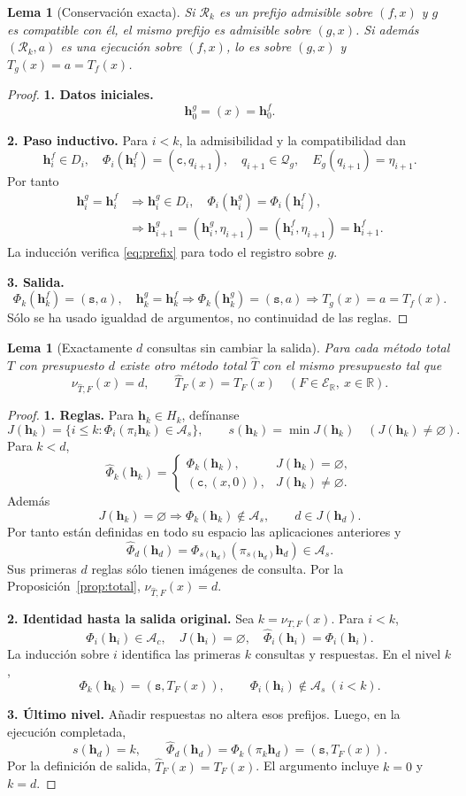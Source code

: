 \documentclass[11pt,a4paper]{article}
\numberwithin{equation}{section}
\newtheorem{lemma}[theorem]{Lema}
\theoremstyle{definition}
\theoremstyle{remark}
\newcommand{\R}{\mathbb R}
\newcommand{\ER}{\mathcal E_{\R}}
\newcommand{\QQ}{\mathcal Q}
\newcommand{\Rec}{\mathcal R}
\newcommand{\hc}{\mathbf h}
\newcommand{\ct}{\mathtt c}
\newcommand{\st}{\mathtt s}
\newcommand{\paso}[1]{\par\smallskip\noindent\textbf{#1}\quad}
\begin{document}
\begin{lemma}[Conservación exacta]\label{lem:preserve}
Si $\Rec_k$ es un prefijo admisible sobre $(f,x)$ y $g$ es compatible con él, el mismo prefijo es admisible sobre $(g,x)$. Si además $(\Rec_k,a)$ es una ejecución sobre $(f,x)$, lo es sobre $(g,x)$ y $T_g(x)=a=T_f(x)$.
\end{lemma}
\begin{proof}
\paso{1. Datos iniciales.}
\[
\hc_0^g=(x)=\hc_0^f.
\]
\paso{2. Paso inductivo.}
Para $i<k$, la admisibilidad y la compatibilidad dan
\[
\hc_i^f\in D_i,\quad\Phi_i(\hc_i^f)=(\ct,q_{i+1}),\quad
q_{i+1}\in\QQ_g,\quad E_g(q_{i+1})=\eta_{i+1}.
\]
Por tanto
\begin{align*}
\hc_i^g=\hc_i^f
&\Longrightarrow \hc_i^g\in D_i,\quad\Phi_i(\hc_i^g)=\Phi_i(\hc_i^f),\\
&\Longrightarrow\hc_{i+1}^g=(\hc_i^g,\eta_{i+1})
=(\hc_i^f,\eta_{i+1})=\hc_{i+1}^f.
\end{align*}
La inducción verifica \eqref{eq:prefix} para todo el registro sobre $g$.
\paso{3. Salida.}
\[
\Phi_k(\hc_k^f)=(\st,a),\quad\hc_k^g=\hc_k^f
\Longrightarrow\Phi_k(\hc_k^g)=(\st,a)
\Longrightarrow T_g(x)=a=T_f(x).
\]
Sólo se ha usado igualdad de argumentos, no continuidad de las reglas.
\end{proof}

\begin{lemma}[Exactamente $d$ consultas sin cambiar la salida]\label{lem:padding}
Para cada método total $T$ con presupuesto $d$ existe otro método total $\widehat T$ con el mismo presupuesto tal que
\[
\nu_{\widehat T,F}(x)=d,\qquad \widehat T_F(x)=T_F(x)
\quad(F\in\ER,\ x\in\R).
\]
\end{lemma}
\begin{proof}
\paso{1. Reglas.}
Para $\hc_k\in H_k$, defínanse
\[
J(\hc_k)=\{i\le k:\Phi_i(\pi_i\hc_k)\in\mathcal A_s\},\qquad
s(\hc_k)=\min J(\hc_k)\quad(J(\hc_k)\ne\varnothing).
\]
Para $k<d$,
\[
\widehat\Phi_k(\hc_k)=
\begin{cases}\Phi_k(\hc_k),&J(\hc_k)=\varnothing,\\
(\ct,(x,0)),&J(\hc_k)\ne\varnothing.
\end{cases}
\]
Además
\[
J(\hc_k)=\varnothing\Longrightarrow\Phi_k(\hc_k)\notin\mathcal A_s,
\qquad d\in J(\hc_d).
\]
Por tanto están definidas en todo su espacio las aplicaciones anteriores y
\[
\widehat\Phi_d(\hc_d)=\Phi_{s(\hc_d)}(\pi_{s(\hc_d)}\hc_d)\in\mathcal A_s.
\]
Sus primeras $d$ reglas sólo tienen imágenes de consulta. Por la Proposición~\ref{prop:total}, $\nu_{\widehat T,F}(x)=d$.
\paso{2. Identidad hasta la salida original.}
Sea $k=\nu_{T,F}(x)$. Para $i<k$,
\[
\Phi_i(\hc_i)\in\mathcal A_c,\quad J(\hc_i)=\varnothing,
\quad\widehat\Phi_i(\hc_i)=\Phi_i(\hc_i).
\]
La inducción sobre $i$ identifica las primeras $k$ consultas y respuestas. En el nivel $k$,
\[
\Phi_k(\hc_k)=(\st,T_F(x)),\qquad
\Phi_i(\hc_i)\notin\mathcal A_s\ (i<k).
\]
\paso{3. Último nivel.}
Añadir respuestas no altera esos prefijos. Luego, en la ejecución completada,
\[
s(\hc_d)=k,\qquad
\widehat\Phi_d(\hc_d)=\Phi_k(\pi_k\hc_d)=(\st,T_F(x)).
\]
Por la definición de salida, $\widehat T_F(x)=T_F(x)$. El argumento incluye $k=0$ y $k=d$.
\end{proof}
\end{document}
